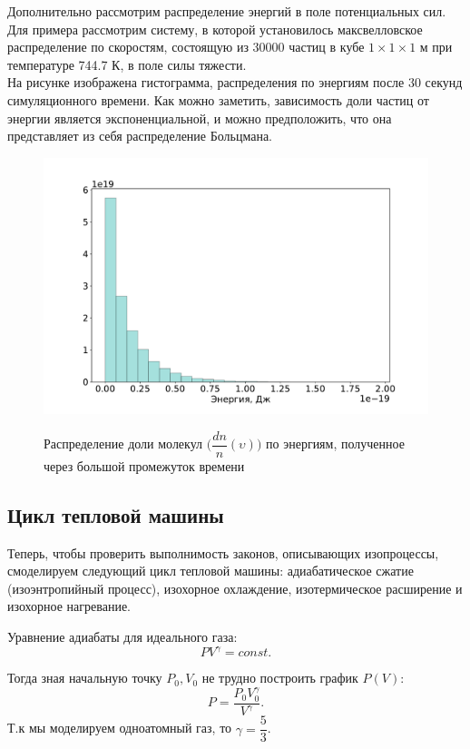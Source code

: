\documentclass[twoside,twocolumn, 11pt]{article}
\theoremstyle{plain}
\theoremstyle{definition}
\begin{document}
Дополнительно рассмотрим распределение энергий в поле потенциальных сил. Для примера рассмотрим систему, в которой установилось максвелловское распределение по скоростям, состоящую из 30000 частиц в кубе $1 \times 1 \times 1$ м при температуре 744.7 К, в поле силы тяжести.\\
\indent На рисунке изображена гистограмма, распределения по энергиям после 30 секунд симуляционного времени. Как можно заметить, зависимость доли частиц от энергии является экспоненциальной, и можно предположить, что она представляет из себя распределение Больцмана.

\begin{figure}[!h]
{\includegraphics[width=1\linewidth]{hist_E}}
\caption{Распределение доли молекул $\Big(\dfrac{dn}{n} (\upsilon) \Big)$ по энергиям, полученное через большой промежуток времени}
\end{figure}

\subsection{Цикл тепловой машины}
Теперь, чтобы проверить выполнимость законов, описывающих изопроцессы, смоделируем следующий цикл тепловой машины:
адиабатическое сжатие (изоэнтропийный процесс), изохорное охлаждение, изотермическое расширение и изохорное нагревание.

Уравнение адиабаты для идеального газа:
\[PV^\gamma = const. \]

Тогда зная начальную точку $P_0, V_0$ не трудно построить график $P(V)$:
\[P = \dfrac{P_0 V_0^\gamma}{V ^\gamma}. \]
Т.к мы моделируем одноатомный газ, то $\gamma = \dfrac{5}{3}$.
\end{document}
